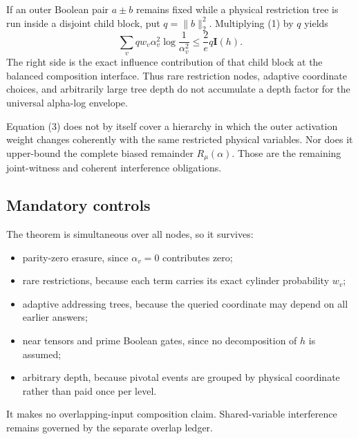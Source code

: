 If an outer Boolean pair \(a\pm b\) remains fixed while a physical
restriction tree is run inside a disjoint child block, put
\(q=\|b\|_2^2\).  Multiplying (1) by \(q\) yields
\[
 \sum_v q w_v\alpha_v^2\log\frac1{\alpha_v^2}
 \le\frac2e q\mathbf I(h).                                       \tag{3}
\]
The right side is the exact influence contribution of that child block
at the balanced composition interface.  Thus rare restriction nodes,
adaptive coordinate choices, and arbitrarily large tree depth do not
accumulate a depth factor for the universal alpha-log envelope.

Equation (3) does not by itself cover a hierarchy in which the outer
activation weight changes coherently with the same restricted physical
variables.  Nor does it upper-bound the complete biased remainder
\(R_\mu(\alpha)\).  Those are the remaining joint-witness and coherent
interference obligations.

\subsection*{Mandatory controls}

The theorem is simultaneous over all nodes, so it survives:
\begin{itemize}
 \item parity-zero erasure, since \(\alpha_v=0\) contributes zero;
 \item rare restrictions, because each term carries its exact cylinder
       probability \(w_v\);
 \item adaptive addressing trees, because the queried coordinate may
       depend on all earlier answers;
 \item near tensors and prime Boolean gates, since no decomposition of
       \(h\) is assumed;
 \item arbitrary depth, because pivotal events are grouped by physical
       coordinate rather than paid once per level.
\end{itemize}
It makes no overlapping-input composition claim.  Shared-variable
interference remains governed by the separate overlap ledger.

